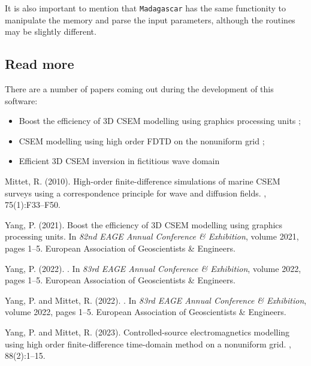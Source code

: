 \documentclass[10pt]{article}
\begin{document}
It is also important to mention that \texttt{Madagascar} has the same functionity to manipulate the memory and parse the input parameters, although the routines may be slightly different.

\subsection{Read more}

There are a number of papers coming out during the development of this software:
\begin{itemize}
 \item Boost the efficiency of 3D CSEM modelling using graphics processing units \citep{Yang_2021_GPU_CSEM};
 \item CSEM modelling using high order FDTD on the nonuniform grid \citep{Yang_2022_HFD_NUgrid,Yang_2023_HFDNU};
 \item Efficient 3D CSEM inversion in fictitious wave domain \citep{Yang_2022_EAGE_Efficient}
\end{itemize}



\newpage

%

\newcommand{\SortNoop}[1]{}
\begin{thebibliography}{}

Mittet, R. (2010).
\newblock High-order finite-difference simulations of marine {CSEM} surveys
  using a correspondence principle for wave and diffusion fields.
, 75(1):F33--F50.

Yang, P. (2021).
\newblock Boost the efficiency of 3{D} {CSEM} modelling using graphics
  processing units.
\newblock In {\em 82nd EAGE Annual Conference \& Exhibition}, volume 2021,
  pages 1--5. European Association of Geoscientists \& Engineers.

Yang, P. (2022).
.
\newblock In {\em 83rd EAGE Annual Conference \& Exhibition}, volume 2022,
  pages 1--5. European Association of Geoscientists \& Engineers.

Yang, P. and Mittet, R. (2022).
.
\newblock In {\em 83rd EAGE Annual Conference \& Exhibition}, volume 2022,
  pages 1--5. European Association of Geoscientists \& Engineers.

Yang, P. and Mittet, R. (2023).
\newblock Controlled-source electromagnetics modelling using high order
  finite-difference time-domain method on a nonuniform grid.
, 88(2):1--15.

\end{thebibliography}
\end{document}
